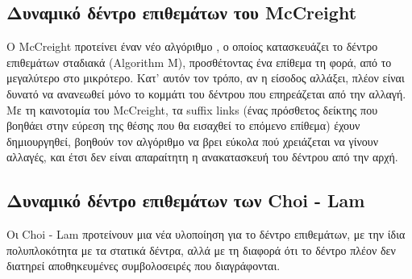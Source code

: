         \subsection{Δυναμικό δέντρο επιθεμάτων του McCreight}
            Ο McCreight προτείνει έναν νέο αλγόριθμο \cite{McCreight_1976}, ο οποίος κατασκευάζει το δέντρο επιθεμάτων σταδιακά (Algorithm M), προσθέτοντας ένα επίθεμα τη φορά, από το μεγαλύτερο στο μικρότερο.
            Κατ' αυτόν τον τρόπο, αν η είσοδος αλλάξει, πλέον είναι δυνατό να ανανεωθεί μόνο το κομμάτι του δέντρου που επηρεάζεται από την αλλαγή.
            Με τη καινοτομία του McCreight, τα suffix links (ένας πρόσθετος δείκτης που βοηθάει στην εύρεση της θέσης που θα εισαχθεί το επόμενο επίθεμα) έχουν δημιουργηθεί, βοηθούν τον αλγόριθμο να βρει εύκολα πού χρειάζεται να γίνουν αλλαγές, και έτσι δεν είναι απαραίτητη η ανακατασκευή του δέντρου από την αρχή.

        \subsection{Δυναμικό δέντρο επιθεμάτων των Choi - Lam}
            Οι Choi - Lam προτείνουν μια νέα υλοποίηση για το δέντρο επιθεμάτων, με την ίδια πολυπλοκότητα με τα στατικά δέντρα, αλλά με τη διαφορά ότι το δέντρο πλέον δεν διατηρεί αποθηκευμένες συμβολοσειρές που διαγράφονται. \cite{Choi_Lam_1997}

